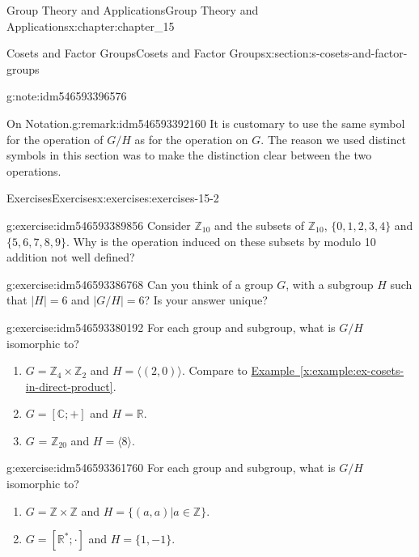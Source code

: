 \documentclass[oneside,10pt,]{book}
\newcommand{\xreffont}{\relax}
\numberwithin{equation}{section}
\begin{document}
\begin{chapterptx}{Group Theory and Applications}{}{Group Theory and Applications}{}{}{x:chapter:chapter_15}
\begin{sectionptx}{Cosets and Factor Groups}{}{Cosets and Factor Groups}{}{}{x:section:s-cosets-and-factor-groups}
\begin{note}{}{g:note:idm546593396576}
\end{note}
\begin{remark}{On Notation.}{g:remark:idm546593392160}%
It is customary to use the same symbol for the operation of \(G/H\) as for the operation on \(G\).  The reason we used distinct symbols in this section was to make the distinction clear between the two operations.%
\end{remark}
%
%
\typeout{************************************************}
\typeout{************************************************}
%
\begin{exercises-subsection}{Exercises}{}{Exercises}{}{}{x:exercises:exercises-15-2}
\begin{divisionexercise}{1}{}{}{g:exercise:idm546593389856}%
Consider \(\mathbb{Z}_{10}\) and the subsets of \(\mathbb{Z}_{10}\), \(\{0, 1, 2, 3, 4\}\) and \(\{5, 6, 7, 8, 9\}\). Why is the operation induced on these subsets by modulo 10 addition not well defined?%
\end{divisionexercise}%
\begin{divisionexercise}{2}{}{}{g:exercise:idm546593386768}%
Can you think of a group \(G\), with a subgroup \(H\) such that \(\lvert H\rvert  = 6\) and \(\lvert G/H\rvert  = 6\)? Is your answer unique?%
\end{divisionexercise}%
\begin{divisionexercise}{3}{}{}{g:exercise:idm546593380192}%
For each group and subgroup, what is \(G/H\) isomorphic to?%
\begin{enumerate}[label=(\alph*)]
\item{}\(G = \mathbb{Z}_4 \times \mathbb{Z}_2\)  and  \(H = \langle (2, 0)\rangle\). Compare to \hyperref[x:example:ex-cosets-in-direct-product]{Example~{\xreffont\ref{x:example:ex-cosets-in-direct-product}}}.%
\item{}\(G = [\mathbb{C}; +]\)  and \(H = \mathbb{R}\).%
\item{}\(G\) = \(\mathbb{Z}_{20}\)  and  \(H = \langle 8\rangle\).%
\end{enumerate}
%
\end{divisionexercise}%
\begin{divisionexercise}{4}{}{}{g:exercise:idm546593361760}%
For each group and subgroup, what is \(G/H\) isomorphic to?%
\begin{enumerate}[label=(\alph*)]
\item{}\(G = \mathbb{Z}\times \mathbb{Z}\) and  \(H = \{(a, a) | a \in  \mathbb{Z}\}\).%
\item{}\(G = \left[\mathbb{R}^*; \cdot \right]\)  and  \(H = \{1, -1\}\).%

\end{enumerate}
\end{divisionexercise}
\end{exercises-subsection}
\end{sectionptx}
\end{chapterptx}
\end{document}
